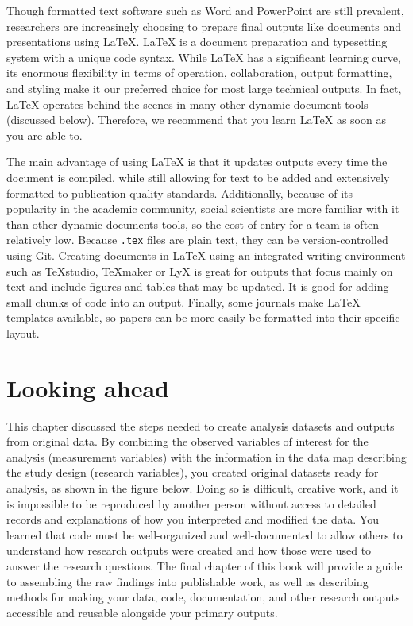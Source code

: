 Though formatted text software such as Word and PowerPoint are still prevalent,
researchers are increasingly choosing to prepare final outputs
like documents and presentations using {\LaTeX}.
{\LaTeX} is a document preparation and typesetting system with a unique code syntax.
While {\LaTeX} has a significant learning curve,
its enormous flexibility in terms of operation, collaboration, output formatting, and styling
make it our preferred choice for most large technical outputs.
In fact, {\LaTeX} operates behind-the-scenes in many other dynamic document tools (discussed below).
Therefore, we recommend that you learn {\LaTeX} as soon as you are able to.

The main advantage of using {\LaTeX} is that it updates outputs every time the document is compiled,
while still allowing for text to be added
and extensively formatted to publication-quality standards.
Additionally, because of its popularity in the academic community,
social scientists are more familiar with it than other dynamic documents tools,
so the cost of entry for a team is often relatively low.
Because \texttt{.tex} files are plain text,
they can be version-controlled using Git.
Creating documents in {\LaTeX} using an integrated writing environment such as TeXstudio, TeXmaker or LyX
is great for outputs that focus mainly on text
and include figures and tables that may be updated.
It is good for adding small chunks of code into an output.
Finally, some journals make {\LaTeX} templates available,
so papers can be more easily be formatted into their specific layout.

\section{Looking ahead}
This chapter discussed the steps needed to
create analysis datasets and outputs from original data.
By combining the observed variables of interest for the analysis (measurement variables)
with the information in the data map describing the study design (research variables),
you created original datasets ready for analysis,
as shown in the figure below.
Doing so is difficult, creative work,
and it is impossible to be reproduced by another person
without access to detailed records and explanations
of how you interpreted and modified the data.
You learned that code must be well-organized and well-documented
to allow others to understand how research outputs were created
and how those were used to answer the research questions.
The final chapter of this book will provide a guide
to assembling the raw findings into publishable work,
as well as describing methods for making your data,
code, documentation, and other research outputs
accessible and reusable alongside your primary outputs.

